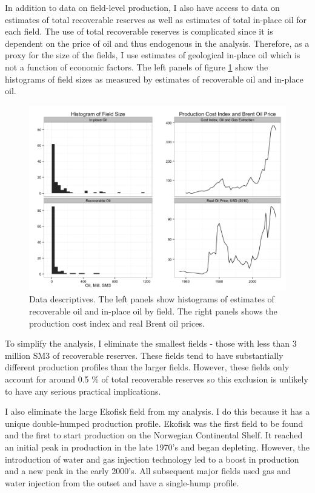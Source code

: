 \documentclass[12pt]{article}
\begin{document}
In addition to data on field-level production, I also have access to data on estimates of total recoverable reserves as well as estimates of total in-place oil for each field. The use of total recoverable reserves is complicated since it is dependent on the price of oil and thus endogenous in the analysis. Therefore, as a proxy for the size of the fields, I use estimates of geological in-place oil which is not a function of economic factors. The left panels of figure \ref{data_descriptives} show the histograms of field sizes as measured by estimates of recoverable oil and in-place oil. 

\begin{figure}
	\includegraphics[width=1\textwidth]{figures/data_descriptives.png}
	\caption{Data descriptives. The left panels show histograms of estimates of recoverable oil and in-place oil by field. The right panels shows the production cost index and real Brent oil prices.}
	\label{data_descriptives}
\end{figure}

To simplify the analysis, I eliminate the smallest fields - those with less than 3 million SM3 of recoverable reserves.  These fields tend to have substantially different production profiles than the larger fields. However, these fields only account for around 0.5 \% of total recoverable reserves so this exclusion is unlikely to have any serious practical implications. 

I also eliminate the large Ekofisk field from my analysis.  I do this because it has a unique double-humped production profile. Ekofisk was the first field to be found and the first to start production on the Norwegian Continental Shelf.  It reached an initial peak in production in the late 1970's and began depleting. However, the introduction of water and gas injection technology led to a boost in production and a new peak in the early 2000's. All subsequent major fields used gas and water injection from the outset and have a single-hump profile. 
\end{document}
